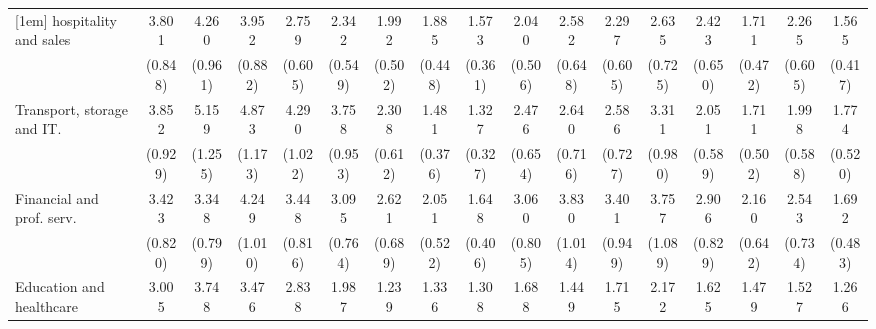 {\begin{tabular}{l*{16}{c}}
[1em]
hospitality and sales&       3.801\sym{***}&       4.260\sym{***}&       3.952\sym{***}&       2.759\sym{***}&       2.342\sym{***}&       1.992\sym{**} &       1.885\sym{**} &       1.573\sym{*}  &       2.040\sym{**} &       2.582\sym{***}&       2.297\sym{**} &       2.635\sym{***}&       2.423\sym{***}&       1.711         &       2.265\sym{**} &       1.565         \\
                    &     (0.848)         &     (0.961)         &     (0.882)         &     (0.605)         &     (0.549)         &     (0.502)         &     (0.448)         &     (0.361)         &     (0.506)         &     (0.648)         &     (0.605)         &     (0.725)         &     (0.650)         &     (0.472)         &     (0.605)         &     (0.417)         \\
[1em]
Transport, storage and IT.&       3.852\sym{***}&       5.159\sym{***}&       4.873\sym{***}&       4.290\sym{***}&       3.758\sym{***}&       2.308\sym{**} &       1.481         &       1.327         &       2.476\sym{***}&       2.640\sym{***}&       2.586\sym{***}&       3.311\sym{***}&       2.051\sym{*}  &       1.711         &       1.998\sym{*}  &       1.774         \\
                    &     (0.929)         &     (1.255)         &     (1.173)         &     (1.022)         &     (0.953)         &     (0.612)         &     (0.376)         &     (0.327)         &     (0.654)         &     (0.716)         &     (0.727)         &     (0.980)         &     (0.589)         &     (0.502)         &     (0.588)         &     (0.520)         \\
[1em]
Financial and prof. serv.&       3.423\sym{***}&       3.348\sym{***}&       4.249\sym{***}&       3.448\sym{***}&       3.095\sym{***}&       2.621\sym{***}&       2.051\sym{**} &       1.648\sym{*}  &       3.060\sym{***}&       3.830\sym{***}&       3.401\sym{***}&       3.757\sym{***}&       2.906\sym{***}&       2.160\sym{**} &       2.543\sym{**} &       1.692         \\
                    &     (0.820)         &     (0.799)         &     (1.010)         &     (0.816)         &     (0.764)         &     (0.689)         &     (0.522)         &     (0.406)         &     (0.805)         &     (1.014)         &     (0.949)         &     (1.089)         &     (0.829)         &     (0.642)         &     (0.734)         &     (0.483)         \\
[1em]
Education and healthcare&       3.005\sym{***}&       3.748\sym{***}&       3.476\sym{***}&       2.838\sym{***}&       1.987\sym{*}  &       1.239         &       1.336         &       1.308         &       1.688         &       1.449         &       1.715         &       2.172\sym{*}  &       1.625         &       1.479         &       1.527         &       1.266         \\

\end{tabular}}
